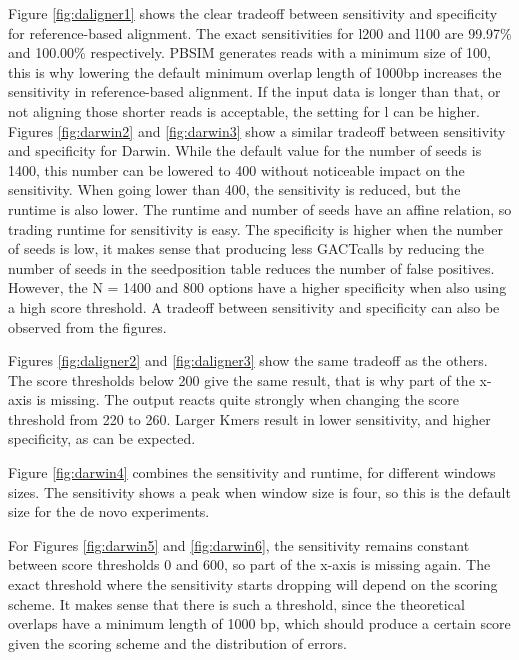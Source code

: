 \documentclass[../thesis.tex]{subfiles}
\begin{document}
Figure \ref{fig:daligner1} shows the clear tradeoff between sensitivity and specificity for reference-based alignment.
The exact sensitivities for l200 and l100 are 99.97\% and 100.00\% respectively.
PBSIM generates reads with a minimum size of 100, this is why lowering the default minimum overlap length of 1000bp increases the sensitivity in reference-based alignment.
If the input data is longer than that, or not aligning those shorter reads is acceptable, the setting for l can be higher.
Figures \ref{fig:darwin2} and \ref{fig:darwin3} show a similar tradeoff between sensitivity and specificity for Darwin.
While the default value for the number of seeds is 1400, this number can be lowered to 400 without noticeable impact on the sensitivity.
When going lower than 400, the sensitivity is reduced, but the runtime is also lower.
The runtime and number of seeds have an affine relation, so trading runtime for sensitivity is easy.
The specificity is higher when the number of seeds is low, it makes sense that producing less GACTcalls by reducing the number of seeds in the seedposition table reduces the number of false positives.
However, the N = 1400 and 800 options have a higher specificity when also using a high score threshold.
A tradeoff between sensitivity and specificity can also be observed from the figures.

Figures \ref{fig:daligner2} and \ref{fig:daligner3} show the same tradeoff as the others.
The score thresholds below 200 give the same result, that is why part of the x-axis is missing.
The output reacts quite strongly when changing the score threshold from 220 to 260.
Larger Kmers result in lower sensitivity, and higher specificity, as can be expected.


Figure \ref{fig:darwin4} combines the sensitivity and runtime, for different windows sizes.
The sensitivity shows a peak when window size is four, so this is the default size for the de novo experiments.

For Figures \ref{fig:darwin5} and \ref{fig:darwin6}, the sensitivity remains constant between score thresholds 0 and 600, so part of the x-axis is missing again.
The exact threshold where the sensitivity starts dropping will depend on the scoring scheme.
It makes sense that there is such a threshold, since the theoretical overlaps have a minimum length of 1000 bp, which should produce a certain score given the scoring scheme and the distribution of errors.
\end{document}
